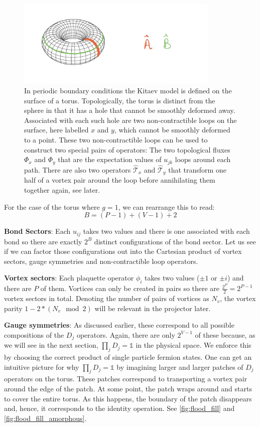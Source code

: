 \begin{figure}
\hypertarget{fig:torus}{%
\centering
\includegraphics[width=0.86\textwidth,height=\textheight]{figure_code/amk_chapter/torus.jpeg}
\caption[Loops on the Torus]{In periodic boundary conditions the Kitaev model is defined on
the surface of a torus. Topologically, the torus is distinct from the
sphere in that it has a hole that cannot be smoothly deformed away.
Associated with each such hole are two non-contractible loops on the
surface, here labelled \(x\) and \(y\), which cannot be smoothly
deformed to a point. These two non-contractible loops can be used to
construct two special pairs of operators: The two topological fluxes
\(\Phi_x\) and \(\Phi_y\) that are the expectation values of \(u_{jk}\)
loops around each path. There are also two operators
\(\hat{\mathcal{T}}_x\) and \(\hat{\mathcal{T}}_y\) that transform one
half of a vortex pair around the loop before annihilating them together
again, see later.}\label{fig:torus}
}
\end{figure}

For the case of the torus where \(g = 1\), we can rearrange this to read: \[B = (P-1) + (V-1) + 2\]

\textbf{Bond Sectors}: Each \(u_{ij}\) takes two values and there is one associated with each bond so there are exactly \(2^B\) distinct configurations of the bond sector. Let us see if we can factor those configurations out into the Cartesian product of vortex sectors, gauge symmetries and non-contractible loop operators.

\textbf{Vortex sectors}: Each plaquette operator \(\phi_i\) takes two values (\(\pm 1\) or \(\pm i\)) and there are \(P\) of them. Vortices can only be created in pairs so there are \(\tfrac{2^P}{2} = 2^{P-1}\) vortex sectors in total. Denoting the number of pairs of vortices as \(N_v\), the vortex parity \(1 - 2*(N_v \mod 2)\) will be relevant in the projector later.

\textbf{Gauge symmetries}: As discussed earlier, these correspond to all possible compositions of the \(D_j\) operators. Again, there are only \(2^{V-1}\) of these because, as we will see in the next section, \(\prod_{j} D_j = \mathbb{1}\) in the physical space. We enforce this by choosing the correct product of single particle fermion states. One can get an intuitive picture for why \(\prod_{j} D_j = \mathbb{1}\) by imagining larger and larger patches of \(D_j\) operators on the torus. These patches correspond to transporting a vortex pair around the edge of the patch. At some point, the patch wraps around and starts to cover the entire torus. As this happens, the boundary of the patch disappears and, hence, it corresponds to the identity operation. See \cref{fig:flood_fill} and \cref{fig:flood_fill_amorphous}.


